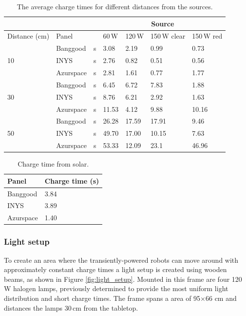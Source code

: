 \begin{table}[t]
	\centering
	\caption{The average charge times for different distances from the sources.}
	\label{tab:light_results}
	\begin{tabular}{|l|l|l||l|l|l|l|}
		\hline
		\multicolumn{3}{|c|}{} & \multicolumn{4}{|c|}{Source} \\
		\hline
		Distance (cm) & Panel & & 60\,W & 120\,W & 150\,W clear & 150\,W red \\
		\hline \hline
		\multirow{3}{*}{10} & Banggood& s & 3.08 & 2.19 & 0.99 & 0.73 \\
		& INYS & s & 2.76 & 0.82 & 0.51 & 0.56 \\
		& Azurspace & s & 2.81 & 1.61 & 0.77 & 1.77 \\
		\hline
		\multirow{3}{*}{30} & Banggood & s & 6.45 & 6.72 & 7.83 & 1.88 \\
		& INYS & s & 8.76 & 6.21 & 2.92 & 1.63 \\
		& Azurspace & s & 11.53 & 4.12 & 9.88 & 10.16\\
		\hline
		\multirow{3}{*}{50} & Banggood & s & 26.28 & 17.59 & 17.91 & 9.46 \\
		& INYS & s & 49.70 & 17.00 & 10.15 & 7.63 \\
		& Azurspace & s & 53.33 & 12.09 & 23.1 & 46.96 \\
		\hline
	\end{tabular}
\end{table}

\begin{table}[t]
	\centering
	\caption{Charge time from solar.}
	\label{tab:solar_results}
	\begin{tabular}{|l|l|}
		\hline
		Panel & Charge time (s) \\
		\hline \hline
		Banggood & 3.84\\
		INYS & 3.89\\ 
		Azurspace & 1.40\\
		\hline
	\end{tabular}
\end{table}

\subsubsection{Light setup}

To create an area where the transiently-powered robots can move around with approximately constant charge times a light setup is created using wooden beams, as shown in Figure \ref{fig:light_setup}.
Mounted in this frame are four 120\,W halogen lamps, previously determined to provide the most uniform light distribution and short charge times.
The frame spans a area of 95$\times$66 cm and distances the lamps 30\,cm from the tabletop.

